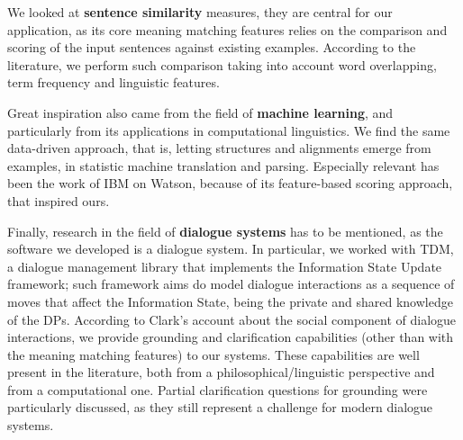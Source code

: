 We looked at \textbf{sentence similarity} measures, they are central for our application, as its core meaning matching features relies on the comparison and scoring of the input sentences against existing examples. According to the literature, we perform such comparison taking into account word overlapping, term frequency and linguistic features.

Great inspiration also came from the field of \textbf{machine learning}, and particularly from its applications in computational linguistics. We find the same data-driven approach, that is, letting structures and alignments emerge from examples, in statistic machine translation and parsing. Especially relevant has been the work of IBM on Watson, because of its feature-based scoring approach, that inspired ours.

Finally, research in the field of \textbf{dialogue systems} has to be mentioned, as the software we developed is a dialogue system. In particular, we worked with TDM, a dialogue management library that implements the Information State Update framework; such framework aims do model dialogue interactions as a sequence of moves that affect the Information State, being the private and shared knowledge of the DPs. According to Clark's account about the social component of dialogue interactions, we provide grounding and clarification capabilities (other than with the meaning matching features) to our systems. These capabilities are well present in the literature, both from a philosophical/linguistic perspective and from a computational one. Partial clarification questions for grounding were particularly discussed, as they still represent a challenge for modern dialogue systems.